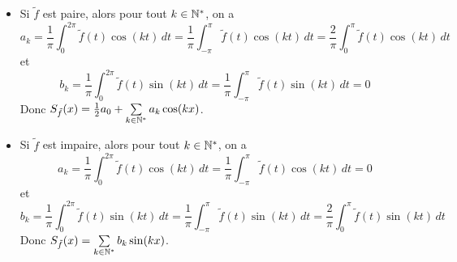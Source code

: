 \documentclass[a4paper, 12pt]{article}
\begin{document}
\begin{demonstration}
    \begin{itemize}[label=\textbullet]
        \item 
        Si $\tilde{f}$ est paire, alors pour tout $k \in \mathbb{N}^*$, on a
        $$
        a_k = \frac{1}{\pi} \int_0^{2\pi} \tilde{f}(t) \cos(kt) \, dt = \frac{1}{\pi} \int_{-\pi}^{\pi} \tilde{f}(t) \cos(kt) \, dt = \frac{2}{\pi} \int_0^{\pi} \tilde{f}(t) \cos(kt) \, dt
        $$
        et
        $$
        b_k = \frac{1}{\pi} \int_0^{2\pi} \tilde{f}(t) \sin(kt) \, dt = \frac{1}{\pi} \int_{-\pi}^{\pi} \tilde{f}(t) \sin(kt) \, dt = 0
        $$
        Donc $S_{\tilde{f}}(x) = \frac{1}{2} a_0 + \sum\limits_{k \in \mathbb{N}^*} a_k \cos(kx)$.
    
    \item
    Si $\tilde{f}$ est impaire, alors pour tout $k \in \mathbb{N}^*$, on a
    $$
    a_k = \frac{1}{\pi} \int_0^{2\pi} \tilde{f}(t) \cos(kt) \, dt = \frac{1}{\pi} \int_{-\pi}^{\pi} \tilde{f}(t) \cos(kt) \, dt = 0
    $$
    et
    $$
    b_k = \frac{1}{\pi} \int_0^{2\pi} \tilde{f}(t) \sin(kt) \, dt = \frac{1}{\pi} \int_{-\pi}^{\pi} \tilde{f}(t) \sin(kt) \, dt = \frac{2}{\pi} \int_0^{\pi} \tilde{f}(t) \sin(kt) \, dt
    $$
    Donc $S_{\tilde{f}}(x) = \sum\limits_{k \in \mathbb{N}^*} b_k \sin(kx)$.
\end{itemize}

\end{demonstration}
\end{document}
